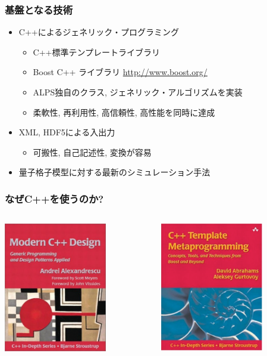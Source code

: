 \begin{frame}
  \frametitle{基盤となる技術}
  \begin{itemize}
    \setlength{\itemsep}{1em}
  \item C++によるジェネリック・プログラミング
    \begin{itemize}
    \item C++標準テンプレートライブラリ
    \item Boost C++ ライブラリ \url{http://www.boost.org/}
    \item ALPS独自のクラス, ジェネリック・アルゴリズムを実装
    \item 柔軟性, 再利用性, 高信頼性, 高性能を同時に達成
    \end{itemize}
  \item XML, HDF5による入出力
    \begin{itemize}
    \item 可搬性, 自己記述性, 変換が容易
    \end{itemize}
  \item 量子格子模型に対する最新のシミュレーション手法
  \end{itemize}
\end{frame}

\begin{frame}
  \frametitle{なぜC++を使うのか?}
  \begin{columns}[T]
    \begin{column}{.5\textwidth}
      \centering \includegraphics[width=4.5cm]{modern-cxx.pdf}
    \end{column}
    \begin{column}{.5\textwidth}
      \centering \includegraphics[width=4.5cm]{cxx-template.pdf}
    \end{column}
  \end{columns}
\end{frame}

